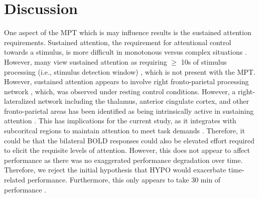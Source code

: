 \section{Discussion}

One aspect of the MPT which is may influence results is the sustained attention requirements. Sustained attention, the requirement for attentional control towards a stimulus, is more difficult in monotonous versus complex situations \cite{langner_sustaining_2013}. However, many view sustained attention as requiring ${\ge}$ 10s of stimulus processing (i.e., stimulus detection window) \cite{langner_sustaining_2013}, which is not present with the MPT. However, sustained attention appears to involve right fronto-parietal processing network \cite{robertson_vigilant_2010}, which, was observed under resting control conditions. However, a right-lateralized network including the thalamus, anterior cingulate cortex, and other fronto-parietal areas has been identified as being intrinsically active in sustaining attention \cite{sturm_functional_2001}. This has implications for the current study, as it integrates with subcoritcal regions to maintain attention to meet task demands \cite{robertson_vigilant_2010}. Therefore, it could be that the bilateral BOLD responses could also be elevated effort required to elicit the requisite levels of attention. However, this does not appear to affect performance as there was no exaggerated performance degradation over time. Therefore, we reject the initial hypothesis that HYPO would exacerbate time-related performance. Furthermore, this only appears to take 30 min of performance \cite{watson_mild_2015}.       




